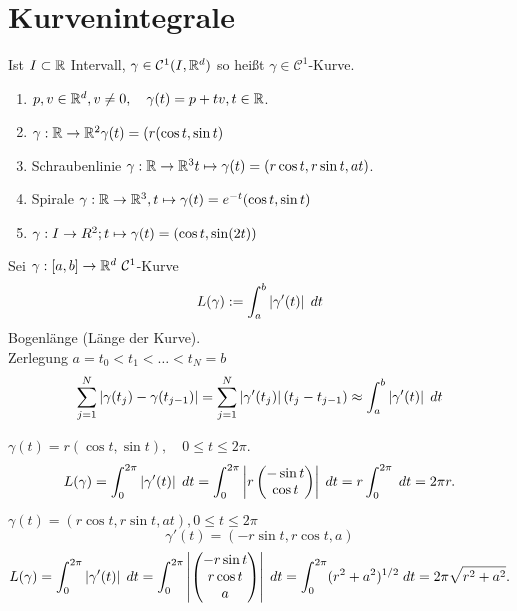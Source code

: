 \documentclass[../ana2.tex]{subfiles}
\begin{document}
\setcounter{section}{18}
\section{Kurvenintegrale}
\begin{defi}
    Ist \( I \subset \R \) Intervall, \( \gamma \in \mathcal{C}^1(I, \R^d) \)
    so heißt \(\gamma \in \mathcal{C}^1\)-Kurve.
\end{defi}
\begin{bspe}\leavevmode
    \begin{enumerate}
    \item \( p, v \in \R^d, v \neq 0, \quad \gamma(t) = p + tv, t \in \R \).
    \item \(\abb{\gamma}{\R}{\R^2} \gamma(t) = (r(\cos t, \sin t) \)
    \item Schraubenlinie \( \abb{\gamma}{\R}{\R^3} t \mapsto \gamma(t) = (r \cos t, r \sin t, at) \).
    \item Spirale \( \abb{\gamma}{\R}{\R^3}, t \mapsto \gamma(t) = e^{-t} (\cos t, \sin t) \)
    \item \( \abb{\gamma}{I}{R^2}; t \mapsto \gamma(t) = (\cos t, \sin (2t))\)
    \end{enumerate}
\end{bspe}
\begin{defi}[Bogenlänge]
    Sei \(\abb{\gamma}{[a,b]}{\R^d}\ \mathcal{C}^1\)-Kurve
    \[ L(\gamma) := \integralx{\abs{\gamma'(t)}}{a}{b}{t} \]
    Bogenlänge (Länge der Kurve).\\
    Zerlegung \(a = t_0 < t_1 < \ldots < t_N = b\)
    \[ \sum_{j=1}^N \abs{\gamma(t_j) - \gamma(t_{j-1})} 
    = \sum_{j=1}^N \abs{\gamma'(t_j)} (t_j - t_{j-1}) 
    \approx \integralx{\abs{\gamma'(t)}}{a}{b}{t} \]
\end{defi}
\begin{bsp}
    \( \gamma(t) = r (\cos t, \sin t), \quad 0 \leq t \leq 2\pi \).
    \[ L(\gamma) = \integralx{\abs{\gamma'(t)}}{0}{2\pi}{t}
    = \integralx{\abs{r \begin{pmatrix}
        -\sin t \\ \cos t
    \end{pmatrix}}}{0}{2\pi}{t} 
    = r \integralx{}{0}{2\pi}{t} = 2\pi r. \]
\end{bsp}
\begin{bsp}
    \(\gamma(t) = (r\cos t, r\sin t, at), 0 \leq t \leq 2 \pi \)
    \[ \gamma'(t) = (-r\sin t, r\cos t, a) \]
    \[ L(\gamma) = \integralx{\abs{\gamma'(t)}}{0}{2\pi}{t} 
    = \integralx{\abs{ \begin{pmatrix}
        -r \sin t \\ r \cos t \\ a
    \end{pmatrix} }}{0}{2\pi}{t} 
    = \integralx{(r^2 + a^2)^{1/2}}{0}{2\pi}{t} 
    = 2\pi \sqrt{r^2 + a^2}. \]
\end{bsp}
\end{document}
